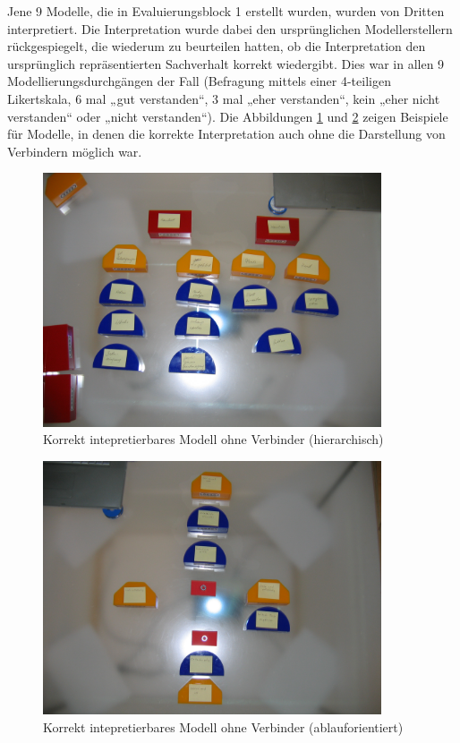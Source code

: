 Jene 9 Modelle, die in Evaluierungsblock 1 erstellt wurden, wurden von Dritten interpretiert. Die Interpretation wurde dabei den ursprünglichen Modellerstellern rückgespiegelt, die wiederum zu beurteilen hatten, ob die Interpretation den ursprünglich repräsentierten Sachverhalt korrekt wiedergibt. Dies war in allen 9 Modellierungsdurchgängen der Fall (Befragung mittels einer 4-teiligen Likertskala, 6 mal „gut verstanden“, 3 mal „eher verstanden“, kein „eher nicht verstanden“ oder „nicht verstanden“). Die Abbildungen  \ref{fig:img_Evaluierung_modell_verbinder_unwichtig1} und \ref{fig:img_Evaluierung_modell_verbinder_unwichtig2} zeigen Beispiele für Modelle, in denen die korrekte Interpretation auch ohne die Darstellung von Verbindern möglich war.

\begin{figure}[htbp]
	\centering
		\includegraphics[width=10cm]{img/Evaluierung/modell_verbinder_unwichtig1.JPG}
	\caption{Korrekt intepretierbares Modell ohne Verbinder (hierarchisch)}
	\label{fig:img_Evaluierung_modell_verbinder_unwichtig1}
\end{figure}

\begin{figure}[htbp]
	\centering
		\includegraphics[width=10cm]{img/Evaluierung/modell_verbinder_unwichtig2.JPG}
	\caption{Korrekt intepretierbares Modell ohne Verbinder (ablauforientiert)}
	\label{fig:img_Evaluierung_modell_verbinder_unwichtig2}
\end{figure}

